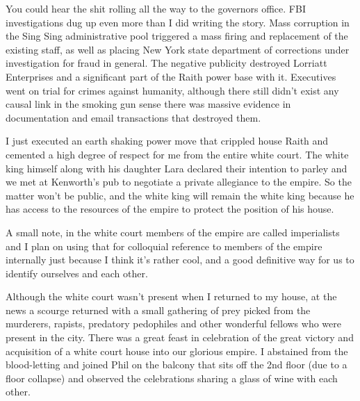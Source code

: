 You could hear the shit rolling all the way to the governors office. FBI investigations dug up even more than I did writing the story. Mass corruption in the Sing Sing administrative pool triggered a mass firing and replacement of the existing staff, as well as placing New York state department of corrections under investigation for fraud in general. The negative publicity destroyed Lorriatt Enterprises and a significant part of the Raith power base with it. Executives went on trial for crimes against humanity, although there still didn't exist any causal link in the smoking gun sense there was massive evidence in documentation and email transactions that destroyed them.

I just executed an earth shaking power move that crippled house Raith and cemented a high degree of respect for me from the entire white court. The white king himself along with his daughter Lara declared their intention to parley and we met at Kenworth's pub to negotiate a private allegiance to the empire. So the matter won't be public, and the white king will remain the white king because he has access to the resources of the empire to protect the position of his house.

A small note, in the white court members of the empire are called imperialists and I plan on using that for colloquial reference to members of the empire internally just because I think it's rather cool, and a good definitive way for us to identify ourselves and each other.

Although the white court wasn't present when I returned to my house, at the news a scourge returned with a small gathering of prey picked from the murderers, rapists, predatory pedophiles and other wonderful fellows who were present in the city. There was a great feast in celebration of the great victory and acquisition of a white court house into our glorious empire. I abstained from the blood-letting and joined Phil on the balcony that sits off the 2nd floor (due to a floor collapse) and observed the celebrations sharing a glass of wine with each other.





